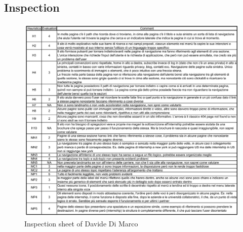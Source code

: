 \documentclass[11pt, letterpaper]{article}
\begin{document}
\subsection{Inspection}
    \begin{figure}[H]
        \centering
        \includegraphics[width=18cm]{images/annex/DD_inspection.png}
        \caption{Inspection sheet of Davide Di Marco}
    \end{figure}
\end{document}
